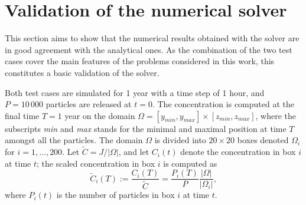 \section{Validation of the numerical solver}
This section aims to show that the numerical results obtained with the solver are in good agreement with the analytical ones. As the combination of the two test cases cover the main features of the problems considered in this work, this constitutes a basic validation of the solver. 

Both test cases are simulated for 1 year with a time step of 1 hour, and $P = 10\,000$ particles are released at $t=0$.
The concentration is computed at the final time $T = 1$ year on the domain $\Omega = [y_{min},y_{max}] \times [z_{min},z_{max}]$, where the subscripts \textit{min} and \textit{max} stands for the minimal and maximal position at time $T$ amongst all the particles. The domain $\Omega$ is divided into $20 \times 20$ boxes denoted $\Omega_i$ for $i = 1,\dots,200$. Let $\tilde C = J/|\Omega|$, and let $C_i(t)$ denote the concentration in box $i$ at time $t$; the scaled concentration in box $i$ is computed as
\begin{equation}
	\tilde C_i(T) := \frac{C_i(T)}{\tilde C} = \frac{P_i(T)}{P}\frac{|\Omega|}{|\Omega_i|},
\end{equation}
where $P_i(t)$ is the number of particles in box $i$ at time $t$.

